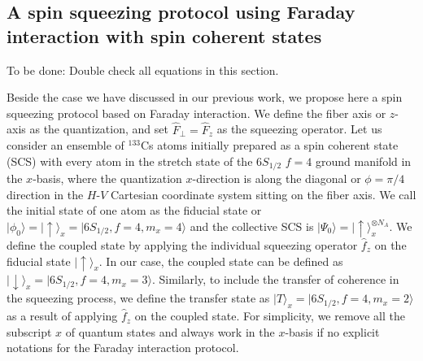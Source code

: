 \documentclass[pra,twocolumn,floatfix,superscriptaddress]{revtex4-1} %
\def\ket#1{\lvert{#1}\rangle}%
\newcommand{\comment}[1]{{\color{Maroon} #1}}
\begin{document}
\subsection{A spin squeezing protocol using Faraday interaction with spin coherent states}
\comment{To be done: Double check all equations in this section.}

Beside the case we have discussed in our previous work, we propose here a spin squeezing protocol based on Faraday interaction.
We define the fiber axis or $ z $-axis as the quantization, and set $ \hat{F}_\perp=\hat{F}_z $ as the squeezing operator. 
Let us consider an ensemble of $ ^{133} $Cs atoms initially prepared as a spin coherent state (SCS) with every atom in the stretch state of the $ 6S_{1/2}$ $f=4 $ ground manifold in the $ x $-basis, where the quantization $ x $-direction is along the diagonal or $ \phi=\pi/4 $ direction in the $ H $-$ V $ Cartesian coordinate system sitting on the fiber axis.
We call the initial state of one atom as the fiducial state or $ \ket{\phi_0}=\ket{\uparrow}_x = \ket{6S_{1/2},f=4,m_x=4} $ and the collective SCS is $ \ket{\Psi_0}=\ket{\uparrow}_x^{\otimes N_A} $.
We define the coupled state by applying the individual squeezing operator $ \hat{f}_z$ on the fiducial state $\ket{\uparrow}_x $.
In our case, the coupled state can be defined as $ \ket{\downarrow}_x=\ket{6S_{1/2},f=4,m_x=3} $.
Similarly, to include the transfer of coherence in the squeezing process, we define the transfer state as $ \ket{T}_x=\ket{6S_{1/2},f=4,m_x=2} $ as a result of applying $ \hat{f}_z$ on the coupled state. 
For simplicity, we remove all the subscript $ x $ of quantum states and always work in the $ x $-basis if no explicit notations for the Faraday interaction protocol. 
\end{document}
